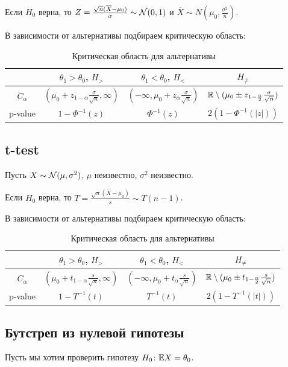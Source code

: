 \documentclass[11pt]{book}
\begin{document}
Если $H_0$ верна, то $Z = \frac{\sqrt{n} (\overline{X} - \mu_0)}{\sigma} \sim \mathcal{N}(0, 1)$ и $\overline{X} \sim N(\mu_0, \frac{\sigma^2}{n})$.

В зависимости от альтернативы подбираем критическую область:
\begin{table}[htpb]
	\centering
	\label{tab:crytical_space_z_test}

	\begin{tabular}{cccc}
		 & $\theta_1 > \theta_0$, $H_{>}$ & $\theta_1 < \theta_0$, $H_{<}$  & $H_{\neq}$ 
		\\
		\hline
		$C_{\alpha}$ & $(\mu_0 + z_{1-\alpha} \frac{\sigma}{\sqrt{n}}, \infty)$ &$(- \infty, \mu_0 + z_{\alpha} \frac{\sigma}{\sqrt{n}})$ & $\mathbb{R} \setminus (\mu_0 \pm z_{1-\frac{\alpha}{2}} \frac{\sigma}{\sqrt{n}})$
		\\
		\hline
		p-value & $1 - \Phi^{-1}(z)$ & $\Phi^{-1}(z)$ & $2(1-\Phi^{-1}(\lvert z \rvert))$
	\end{tabular}
	\caption{Критическая область для альтернативы}
\end{table}
\subsection{t-test}
Пусть $X \sim \mathcal{N}(\mu, \sigma^2)$, $\mu$ неизвестно, $\sigma^2$ неизвестно.

Если $H_0$ верна, то $T = \frac{\sqrt{n} (\overline{X} - \mu_0)}{s} \sim T(n-1)$.

В зависимости от альтернативы подбираем критическую область:
\begin{table}[htpb]
	\centering
	\label{tab:crytical_space_t_test}

	\begin{tabular}{cccc}
		 & $\theta_1 > \theta_0$, $H_{>}$ & $\theta_1 < \theta_0$, $H_{<}$  & $H_{\neq}$ 
		\\
		\hline
		$C_{\alpha}$ & $(\mu_0 + t_{1-\alpha} \frac{s}{\sqrt{n}}, \infty)$ &$(- \infty, \mu_0 + t_{\alpha} \frac{s}{\sqrt{n}})$ & $\mathbb{R} \setminus (\mu_0 \pm t_{1-\frac{\alpha}{2}} \frac{s}{\sqrt{n}})$
		\\
		\hline
		p-value & $1 - T^{-1}(t)$ & $T^{-1}(t)$ & $2(1-T^{-1}(\lvert t \rvert))$
	\end{tabular}
	\caption{Критическая область для альтернативы}
\end{table}

\subsection{Бутстреп из нулевой гипотезы}
Пусть мы хотим проверить гипотезу $H_0\colon \mathbb{E} X = \theta_0$.
\end{document}
